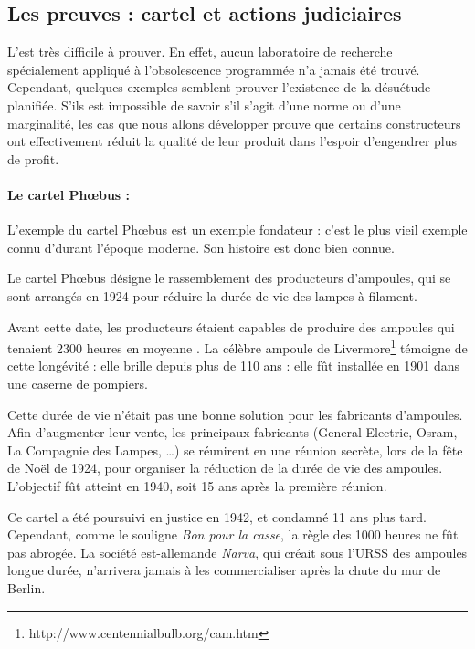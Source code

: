 

\subsection{Les preuves : cartel et actions judiciaires}


L'\op est très difficile à prouver. En effet, aucun laboratoire de recherche spécialement appliqué à l'obsolescence programmée n'a jamais été trouvé. Cependant, quelques exemples semblent prouver l'existence de la désuétude planifiée. S'ils est impossible de savoir s'il s'agit d'une norme ou d'une marginalité, les cas que nous allons développer prouve que certains constructeurs ont effectivement réduit la qualité de leur produit dans l'espoir d'engendrer plus de profit. 

\paragraph*{Le cartel Phœbus : } L'exemple du cartel Phœbus est un exemple fondateur : c'est le plus vieil exemple connu d'\op durant l'époque moderne. Son histoire est donc bien connue. 

Le cartel Phœbus désigne le rassemblement des producteurs d'ampoules, qui se sont arrangés en 1924 pour réduire la durée de vie des lampes à filament. 

Avant cette date, les producteurs étaient capables de produire des ampoules qui tenaient 2300 heures en moyenne \cite{opes_PHOEBUS}. La célèbre ampoule de Livermore\footnote{http://www.centennialbulb.org/cam.htm} témoigne de cette longévité : elle brille depuis plus de 110 ans : elle fût installée en 1901 dans une caserne de pompiers. 

Cette durée de vie n'était pas une bonne solution pour les fabricants d'ampoules. Afin d'augmenter leur vente,  les principaux fabricants (General Electric, Osram, La Compagnie des Lampes, \dots) se réunirent en une réunion secrète, lors de la fête de Noël de 1924, pour organiser la  réduction de la durée de vie des ampoules. L'objectif fût atteint  en 1940, soit 15 ans après la première réunion. 

Ce cartel a été poursuivi en justice en 1942, et condamné 11 ans plus tard. Cependant, comme le souligne \textit{Bon pour la casse}, la règle des 1000 heures ne fût pas abrogée. La société est-allemande \textit{Narva}, qui créait sous l'URSS des ampoules longue durée, n'arrivera jamais à les commercialiser après la chute du mur de Berlin. 

